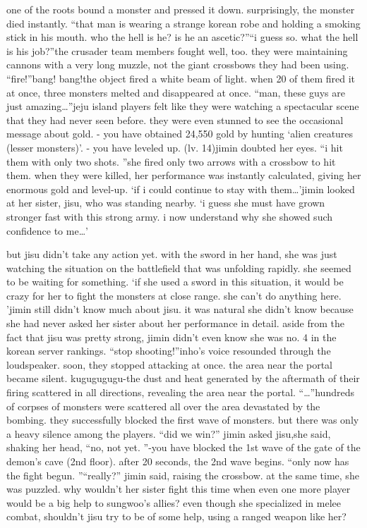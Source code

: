  one of the roots bound a monster and pressed it down.
 surprisingly, the monster died instantly.
“that man is wearing a strange korean robe and holding a smoking stick in his mouth.
 who the hell is he? is he an ascetic?”“i guess so.
 what the hell is his job?”the crusader team members fought well, too.
 they were maintaining cannons with a very long muzzle, not the giant crossbows they had been using.
“fire!”bang! bang!the object fired a white beam of light.
 when 20 of them fired it at once, three monsters melted and disappeared at once.
“man, these guys are just amazing…”jeju island players felt like they were watching a spectacular scene that they had never seen before.
 they were even stunned to see the occasional message about gold.
- you have obtained 24,550 gold by hunting ‘alien creatures (lesser monsters)’.
- you have leveled up.
 (lv.
 14)jimin doubted her eyes.
“i hit them with only two shots.
”she fired only two arrows with a crossbow to hit them.
 when they were killed, her performance was instantly calculated, giving her enormous gold and level-up.
‘if i could continue to stay with them…’jimin looked at her sister, jisu, who was standing nearby.
‘i guess she must have grown stronger fast with this strong army.
 i now understand why she showed such confidence to me…’

but jisu didn’t take any action yet.
 with the sword in her hand, she was just watching the situation on the battlefield that was unfolding rapidly.
 she seemed to be waiting for something.
‘if she used a sword in this situation, it would be crazy for her to fight the monsters at close range.
 she can’t do anything here.
’jimin still didn’t know much about jisu.
 it was natural she didn’t know because she had never asked her sister about her performance in detail.
 aside from the fact that jisu was pretty strong, jimin didn’t even know she was no.
 4 in the korean server rankings.
“stop shooting!”inho’s voice resounded through the loudspeaker.
 soon, they stopped attacking at once.
the area near the portal became silent.
kugugugugu-the dust and heat generated by the aftermath of their firing scattered in all directions, revealing the area near the portal.
“…”hundreds of corpses of monsters were scattered all over the area devastated by the bombing.
they successfully blocked the first wave of monsters.
 but there was only a heavy silence among the players.
“did we win?” jimin asked jisu,she said, shaking her head, “no, not yet.
”-you have blocked the 1st wave of the gate of the demon’s cave (2nd floor).
 after 20 seconds, the 2nd wave begins.
“only now has the fight begun.
”“really?” jimin said, raising the crossbow.
at the same time, she was puzzled.
 why wouldn’t her sister fight this time when even one more player would be a big help to sungwoo’s allies? even though she specialized in melee combat, shouldn’t jisu try to be of some help, using a ranged weapon like her?

 